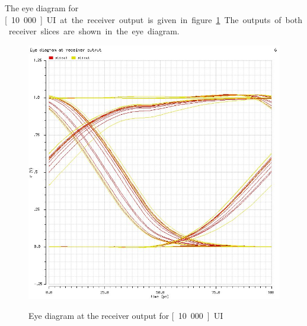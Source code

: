 The eye diagram for \unit[10.000]{UI} at the receiver output is given in figure \ref{fig:rx_out_eye}. The outputs of both receiver slices are shown in the eye diagram.

\begin{figure}[H]
  \centering
  {\includegraphics[scale=0.8]{img/rx_out_eye.jpg}}
  \caption{Eye diagram at the receiver output for \unit[10.000]{UI}}
  \label{fig:rx_out_eye}
\end{figure}
